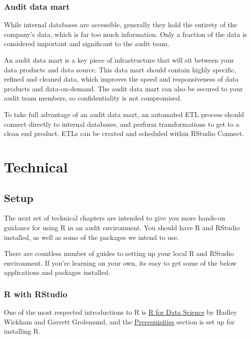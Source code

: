 \documentclass[
]{book}
\begin{document}
\hypertarget{audit-data-mart}{%
\section{Audit data mart}\label{audit-data-mart}}

While internal databases are accessible, generally they hold the entirety of the company's data, which is far too much information. Only a fraction of the data is considered important and significant to the audit team.

An audit data mart is a key piece of infrastructure that will sit between your data products and data source. This data mart should contain highly specific, refined and cleaned data, which improves the speed and responsiveness of data products and data-on-demand. The audit data mart can also be secured to your audit team members, so confidentiality is not compromised.

To take full advantage of an audit data mart, an automated ETL process should connect directly to internal databases, and perform transformations to get to a clean end product. ETLs can be created and scheduled within RStudio Connect.

\hypertarget{part-technical}{%
\part{Technical}\label{part-technical}}

\hypertarget{setup}{%
\chapter{Setup}\label{setup}}

The next set of technical chapters are intended to give you more hands-on guidance for using R in an audit environment. You should have R and RStudio installed, as well as some of the packages we intend to use.

There are countless number of guides to setting up your local R and RStudio environment. If you're learning on your own, its easy to get some of the below applications and packages installed.

\hypertarget{setup-r}{%
\section{R with RStudio}\label{setup-r}}

One of the most respected introductions to R is \href{https://r4ds.had.co.nz/introduction.html}{R for Data Science} by Hadley Wickham and Garrett Grolemund, and the \href{https://r4ds.had.co.nz/introduction.html\#prerequisites}{Prerequisities} section is set up for installing R.
\end{document}
